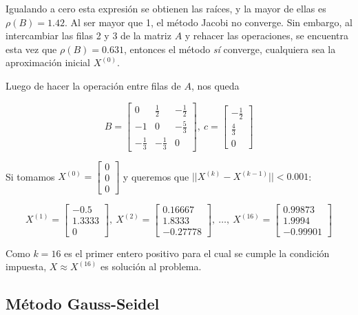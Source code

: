 \documentclass{article}
\begin{document}
Igualando a cero esta expresión se obtienen las raíces, y la mayor de ellas es $\rho(B) = 1.42$. Al ser mayor que 1, el método Jacobi no converge. Sin embargo, al intercambiar las filas 2 y 3 de la matriz $A$ y rehacer las operaciones, se encuentra esta vez que $\rho(B) = 0.631$, entonces el método \textit{sí} converge, cualquiera sea la aproximación inicial $X^{(0)}$.

Luego de hacer la operación entre filas de $A$, nos queda

\begin{equation*}
    B = 
    \begin{bmatrix}
        0 & \frac{1}{2} & -\frac{1}{2} \\
        -1 & 0 & -\frac{5}{3} \\
        -\frac{1}{3} & -\frac{1}{3} & 0
    \end{bmatrix},\ 
    c = 
    \begin{bmatrix}
        -\frac{1}{2} \\ \frac{4}{3} \\ 0
    \end{bmatrix}
\end{equation*}

Si tomamos $X^{(0)} = \begin{bmatrix}0\\0\\0\end{bmatrix}$ y queremos que $||X^{(k)} - X^{(k-1)}||<0.001$:

\begin{equation*}
    X^{(1)} = \begin{bmatrix}-0.5\\1.3333\\0\end{bmatrix},\ 
    X^{(2)} = \begin{bmatrix}0.16667\\1.8333\\-0.27778\end{bmatrix},\ \dots,\ 
    X^{(16)} = \begin{bmatrix}0.99873\\1.9994\\-0.99901\end{bmatrix} 
\end{equation*}

Como $k = 16$ es el primer entero positivo para el cual se cumple la condición impuesta, $X\approx X^{(16)}$ es solución al problema.

\subsection{Método Gauss-Seidel}
\end{document}
